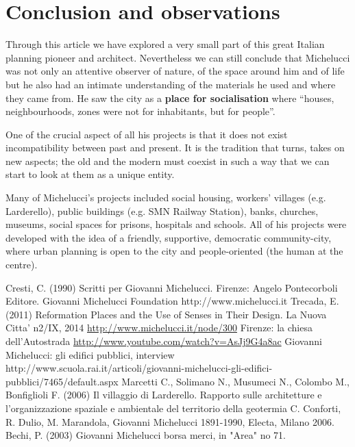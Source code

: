 \documentclass[a4paper,11pt]{article}
\begin{document}
\section{Conclusion and observations}
Through this article we have explored a very small part of this great Italian planning pioneer and architect. Nevertheless we can still conclude that Michelucci was not only an attentive observer of nature, of the space around him and of life but he also had an intimate understanding of the materials he used and where they came from. He saw the city as a \textbf{place for socialisation} where ``houses, neighbourhoods, zones were not for inhabitants, but for people''.

One of the crucial aspect of all his projects is that it does not exist incompatibility between past and present. It is the tradition that turns, takes on new aspects; the old and the modern must coexist in such a way that we can start to look at them as a unique entity.

Many of Michelucci's projects included social housing, workers' villages (e.g. Larderello), public buildings (e.g. SMN Railway Station), banks, churches, museums, social spaces for prisons, hospitals and schools. All of his projects were developed with the idea of a friendly, supportive, democratic community-city, where urban planning is open to the city and people-oriented (the human at the centre).

\newpage

\begin{thebibliography}{widest entry}
   Cresti, C. (1990) Scritti per Giovanni Michelucci. Firenze: Angelo Pontecorboli Editore.
   Giovanni Michelucci Foundation http://www.michelucci.it
   Trecada, E. (2011) Reformation Places and the Use of Senses in Their Design.
   La Nuova Citta' n2/IX, 2014 \url{http://www.michelucci.it/node/300}
   Firenze: la chiesa dell'Autostrada \url{http://www.youtube.com/watch?v=AsJj9G4a8ac}
   Giovanni Michelucci: gli edifici pubblici, interview http://www.scuola.rai.it/articoli/giovanni-michelucci-gli-edifici-pubblici/7465/default.aspx
   Marcetti C., Solimano N., Musumeci N., Colombo M., Bonfiglioli F. (2006) Il villaggio di Larderello. Rapporto sulle architetture e l'organizzazione spaziale e ambientale del territorio della geotermia
   C. Conforti, R. Dulio, M. Marandola, Giovanni Michelucci 1891-1990, Electa, Milano 2006.
   Bechi, P. (2003) Giovanni Michelucci borsa merci, in "Area" no 71.
\end{thebibliography}
\end{document}
